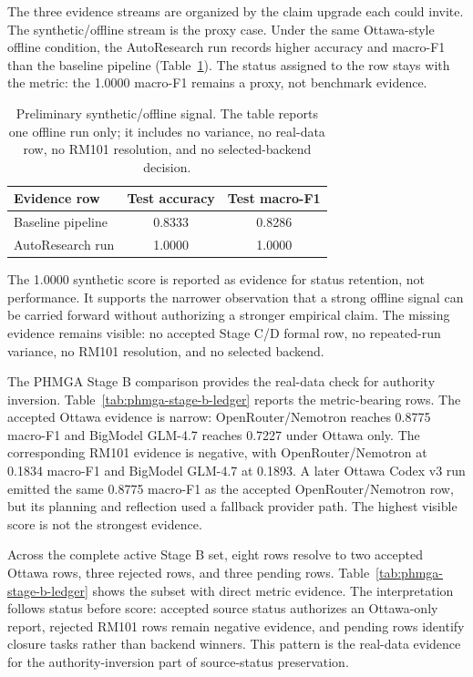 The three evidence streams are organized by the claim upgrade each could invite. The synthetic/offline stream is the proxy case. Under the same Ottawa-style offline condition, the AutoResearch run records higher accuracy and macro-F1 than the baseline pipeline (Table~\ref{tab:p1-synthetic-signal}). The status assigned to the row stays with the metric: the 1.0000 macro-F1 remains a proxy, not benchmark evidence.

\begin{table}[t]
\centering
\begin{tabular}{lcc}
\toprule
Evidence row & Test accuracy & Test macro-F1 \\
\midrule
Baseline pipeline & 0.8333 & 0.8286 \\
AutoResearch run & 1.0000 & 1.0000 \\
\bottomrule
\end{tabular}
\caption{Preliminary synthetic/offline signal. The table reports one offline run only; it includes no variance, no real-data row, no RM101 resolution, and no selected-backend decision.}
\label{tab:p1-synthetic-signal}
\end{table}

The 1.0000 synthetic score is reported as evidence for status retention, not performance. It supports the narrower observation that a strong offline signal can be carried forward without authorizing a stronger empirical claim. The missing evidence remains visible: no accepted Stage C/D formal row, no repeated-run variance, no RM101 resolution, and no selected backend.

The PHMGA Stage B comparison provides the real-data check for authority inversion. Table~\ref{tab:phmga-stage-b-ledger} reports the metric-bearing rows. The accepted Ottawa evidence is narrow: OpenRouter/Nemotron reaches 0.8775 macro-F1 and BigModel GLM-4.7 reaches 0.7227 under Ottawa only. The corresponding RM101 evidence is negative, with OpenRouter/Nemotron at 0.1834 macro-F1 and BigModel GLM-4.7 at 0.1893. A later Ottawa Codex v3 run emitted the same 0.8775 macro-F1 as the accepted OpenRouter/Nemotron row, but its planning and reflection used a fallback provider path. The highest visible score is not the strongest evidence.

Across the complete active Stage B set, eight rows resolve to two accepted Ottawa rows, three rejected rows, and three pending rows. Table~\ref{tab:phmga-stage-b-ledger} shows the subset with direct metric evidence. The interpretation follows status before score: accepted source status authorizes an Ottawa-only report, rejected RM101 rows remain negative evidence, and pending rows identify closure tasks rather than backend winners. This pattern is the real-data evidence for the authority-inversion part of source-status preservation.

